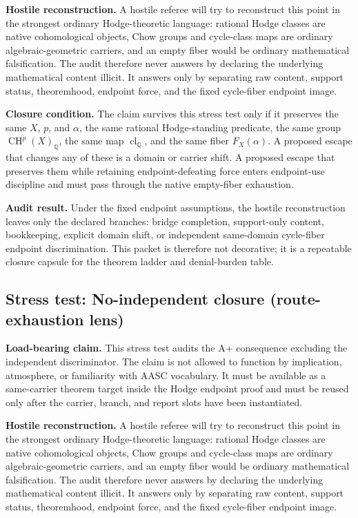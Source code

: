 \documentclass[11pt]{article}
\newcommand{\QQ}{\mathbb{Q}}
\newcommand{\CH}{\operatorname{CH}}
\newcommand{\clQ}{\operatorname{cl}_{\QQ}}
\begin{document}
\par\noindent\textbf{Hostile reconstruction.} A hostile referee will try to reconstruct this point in the strongest ordinary Hodge-theoretic language: rational Hodge classes are native cohomological objects, Chow groups and cycle-class maps are ordinary algebraic-geometric carriers, and an empty fiber would be ordinary mathematical falsification. The audit therefore never answers by declaring the underlying mathematical content illicit. It answers only by separating raw content, support status, theoremhood, endpoint force, and the fixed cycle-fiber endpoint image.

\par\noindent\textbf{Closure condition.} The claim survives this stress test only if it preserves the same $X$, $p$, and $\alpha$, the same rational Hodge-standing predicate, the same group $\CH^p(X)_\QQ$, the same map $\clQ$, and the same fiber $F_X(\alpha)$. A proposed escape that changes any of these is a domain or carrier shift. A proposed escape that preserves them while retaining endpoint-defeating force enters endpoint-use discipline and must pass through the native empty-fiber exhaustion.

\par\noindent\textbf{Audit result.} Under the fixed endpoint assumptions, the hostile reconstruction leaves only the declared branches: bridge completion, support-only content, bookkeeping, explicit domain shift, or independent same-domain cycle-fiber endpoint discrimination. This packet is therefore not decorative; it is a repeatable closure capsule for the theorem ladder and denial-burden table.


\subsection{Stress test: No-independent closure (route-exhaustion lens)}

\par\noindent\textbf{Load-bearing claim.} This stress test audits the A+ consequence excluding the independent discriminator. The claim is not allowed to function by implication, atmosphere, or familiarity with AASC vocabulary. It must be available as a same-carrier theorem target inside the Hodge endpoint proof and must be reused only after the carrier, branch, and report slots have been instantiated.

\par\noindent\textbf{Hostile reconstruction.} A hostile referee will try to reconstruct this point in the strongest ordinary Hodge-theoretic language: rational Hodge classes are native cohomological objects, Chow groups and cycle-class maps are ordinary algebraic-geometric carriers, and an empty fiber would be ordinary mathematical falsification. The audit therefore never answers by declaring the underlying mathematical content illicit. It answers only by separating raw content, support status, theoremhood, endpoint force, and the fixed cycle-fiber endpoint image.
\end{document}
